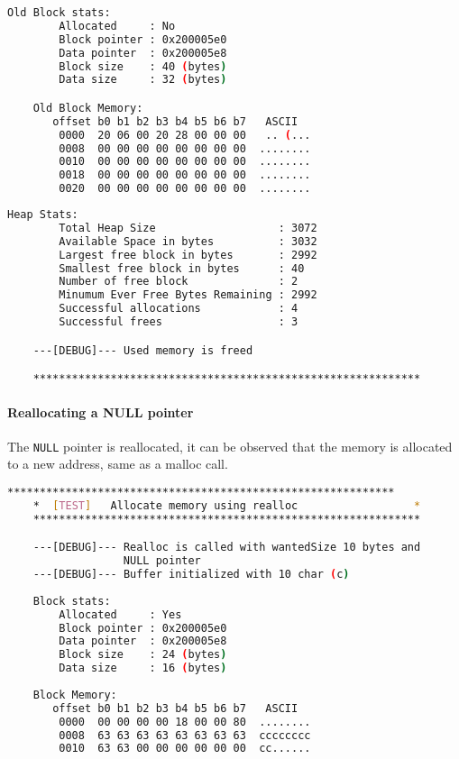     \begin{outputbox}
    \begin{lstlisting}[language=bash]
    Old Block stats:
        Allocated     : No
        Block pointer : 0x200005e0
        Data pointer  : 0x200005e8
        Block size    : 40 (bytes)
        Data size     : 32 (bytes)

    Old Block Memory:
       offset b0 b1 b2 b3 b4 b5 b6 b7   ASCII
        0000  20 06 00 20 28 00 00 00   .. (...
        0008  00 00 00 00 00 00 00 00  ........
        0010  00 00 00 00 00 00 00 00  ........
        0018  00 00 00 00 00 00 00 00  ........
        0020  00 00 00 00 00 00 00 00  ........
    \end{lstlisting}
    \end{outputbox}

    \begin{outputbox}
    \begin{lstlisting}[language=bash]
    Heap Stats:
        Total Heap Size                   : 3072
        Available Space in bytes          : 3032
        Largest free block in bytes       : 2992
        Smallest free block in bytes      : 40
        Number of free block              : 2
        Minumum Ever Free Bytes Remaining : 2992
        Successful allocations            : 4
        Successful frees                  : 3

    ---[DEBUG]--- Used memory is freed

    ************************************************************
    \end{lstlisting}
    \end{outputbox}

    \paragraph{Reallocating a NULL pointer}
    The \texttt{NULL} pointer is reallocated, it can be observed that the memory is allocated to a new address, same as a malloc call.

    \begin{outputbox}
    \begin{lstlisting}[language=bash]
    ************************************************************
    *  [TEST]   Allocate memory using realloc                  *
    ************************************************************

    ---[DEBUG]--- Realloc is called with wantedSize 10 bytes and
                  NULL pointer
    ---[DEBUG]--- Buffer initialized with 10 char (c)
    
    Block stats:
        Allocated     : Yes
        Block pointer : 0x200005e0
        Data pointer  : 0x200005e8
        Block size    : 24 (bytes)
        Data size     : 16 (bytes)
    
    Block Memory:
       offset b0 b1 b2 b3 b4 b5 b6 b7   ASCII
        0000  00 00 00 00 18 00 00 80  ........
        0008  63 63 63 63 63 63 63 63  cccccccc
        0010  63 63 00 00 00 00 00 00  cc......
    \end{lstlisting}
    \end{outputbox}

